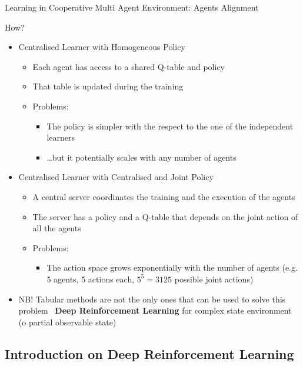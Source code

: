 \documentclass[presentation, 8pt]{beamer}\mode<presentation>{\usetheme{AMSBolognaFC}}
\begin{document}
\begin{frame}[allowframebreaks]{Learning in Cooperative Multi Agent Environment: Agents Alignment}
\begin{alertblock}{How?}
\begin{itemize}
\begin{itemize}
\begin{itemize}
				\item It hardly scales with the number of agent
			\end{itemize}
		\end{itemize}
		\item Centralised Learner with Homogeneous Policy
		\begin{itemize}
			\item Each agent has access to a shared Q-table and policy
			\item That table is updated during the training
			\item Problems:
			\begin{itemize}
				\item The policy is simpler with the respect to the one of the independent learners
				\item \dots but it potentially scales with any number of agents
			\end{itemize}
		\end{itemize}
		\item Centralised Learner with Centralised and Joint Policy
		\begin{itemize}
			\item A central server coordinates the training and the execution of the agents
			\item The server has a policy and a Q-table that depends on the joint action of all the agents
			\item Problems:
			\begin{itemize}
				\item The action space grows exponentially with the number of agents (e.g. 5 agents, 5 actions each, $5^5=3125$ possible joint actions)
			\end{itemize}
		\end{itemize}
		\item NB! Tabular methods are not the only ones that can be used to solve this problem \faArrowRight \, \textbf{Deep Reinforcement Learning} for complex state environment (o partial observable state)
	\end{itemize}
\end{alertblock}
\end{frame}
\subsection{Introduction on Deep Reinforcement Learning}
\end{document}
